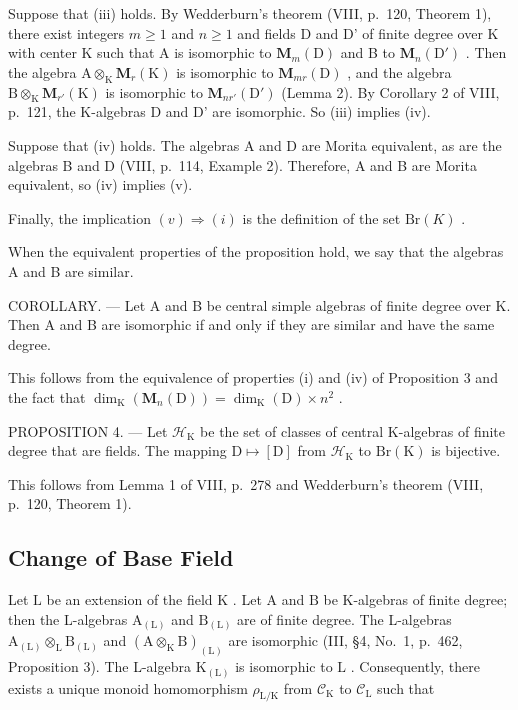 Suppose that (iii) holds. By Wedderburn's theorem (VIII, p.~120, Theorem 1), there exist integers \(m \geqslant 1\) and \(n \geqslant 1\) and fields D and D' of finite degree over K with center K such that A is isomorphic to \(\mathbf{M}_m(\mathrm{D})\) and B to \(\mathbf{M}_n(\mathrm{D}')\) . Then the algebra \(\mathrm{A} \otimes_{\mathrm{K}} \mathbf{M}_r(\mathrm{K})\) is isomorphic to \(\mathbf{M}_{mr}(\mathrm{D})\) , and the algebra \(\mathrm{B} \otimes_{\mathrm{K}} \mathbf{M}_{r'}(\mathrm{K})\) is isomorphic to \(\mathbf{M}_{nr'}(\mathrm{D}')\) (Lemma 2). By Corollary 2 of VIII, p.~121, the K-algebras D and D' are isomorphic. So (iii) implies (iv).

Suppose that (iv) holds. The algebras A and D are Morita equivalent, as are the algebras B and D (VIII, p.~114, Example 2). Therefore, A and B are Morita equivalent, so (iv) implies (v).

Finally, the implication \((v)\Rightarrow(i)\) is the definition of the set \(\mathrm{Br}(K)\) .

When the equivalent properties of the proposition hold, we say that the algebras A and B are similar.

COROLLARY. --- Let A and B be central simple algebras of finite degree over K. Then A and B are isomorphic if and only if they are similar and have the same degree.

This follows from the equivalence of properties (i) and (iv) of Proposition 3 and the fact that \(\dim_{\mathrm{K}}(\mathbf{M}_n(\mathrm{D})) = \dim_{\mathrm{K}}(\mathrm{D}) \times n^2\) .

PROPOSITION 4. --- Let \(\mathcal{H}_{\mathrm{K}}\) be the set of classes of central K-algebras of finite degree that are fields. The mapping \(\mathrm{D} \mapsto [\mathrm{D}]\) from \(\mathcal{H}_{\mathrm{K}}\) to \(\mathrm{Br}(\mathrm{K})\) is bijective.

This follows from Lemma 1 of VIII, p.~278 and Wedderburn's theorem (VIII, p.~120, Theorem 1).

\subsection{Change of Base Field}

Let \(\mathrm{L}\) be an extension of the field \(\mathrm{K}\) . Let \(\mathrm{A}\) and \(\mathrm{B}\) be K-algebras of finite degree; then the L-algebras \(\mathrm{A}_{(\mathrm{L})}\) and \(\mathrm{B}_{(\mathrm{L})}\) are of finite degree. The L-algebras \(\mathrm{A}_{(\mathrm{L})} \otimes_{\mathrm{L}} \mathrm{B}_{(\mathrm{L})}\) and \((\mathrm{A} \otimes_{\mathrm{K}} \mathrm{B})_{(\mathrm{L})}\) are isomorphic (III, §4, No.~1, p.~462, Proposition 3). The L-algebra \(\mathrm{K}_{(\mathrm{L})}\) is isomorphic to \(\mathrm{L}\) . Consequently, there exists a unique monoid homomorphism \(\rho_{\mathrm{L/K}}\) from \(\mathcal{C}_{\mathrm{K}}\) to \(\mathcal{C}_{\mathrm{L}}\) such that

